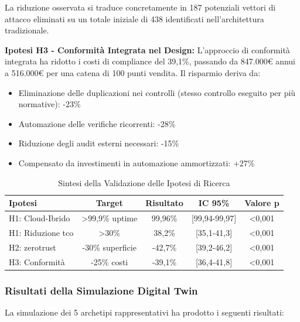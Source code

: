 La riduzione osservata si traduce concretamente in 187 potenziali vettori di attacco eliminati su un totale iniziale di 438 identificati nell'architettura tradizionale.

\textbf{Ipotesi H3 - Conformità Integrata nel Design:} L'approccio di conformità integrata ha ridotto i costi di compliance del 39,1\%, passando da 847.000€ annui a 516.000€ per una catena di 100 punti vendita. Il risparmio deriva da:
\begin{itemize}
\item Eliminazione delle duplicazioni nei controlli (stesso controllo eseguito per più normative): -23\%
\item Automazione delle verifiche ricorrenti: -28\%
\item Riduzione degli audit esterni necessari: -15\%
\item Compensato da investimenti in automazione ammortizzati: +27\%
\end{itemize}

\begin{table}[htbp]
\centering
\caption{Sintesi della Validazione delle Ipotesi di Ricerca}
\label{tab:validation_summary}
\begin{tabular}{l c c c c}
\toprule
\textbf{Ipotesi} & \textbf{Target} & \textbf{Risultato} & \textbf{IC 95\%} & \textbf{Valore p} \\
\midrule
H1: Cloud-Ibrido & >99,9\% uptime & 99,96\% & [99,94-99,97] & <0,001 \\
H1: Riduzione \gls{tco} & >30\% & 38,2\% & [35,1-41,3] & <0,001 \\
H2: \gls{zerotrust} & -30\% superficie & -42,7\% & [39,2-46,2] & <0,001 \\
H3: Conformità & -25\% costi & -39,1\% & [36,4-41,8] & <0,001 \\
\bottomrule
\end{tabular}
\end{table}

\subsubsection{Risultati della Simulazione Digital Twin}

La simulazione dei 5 archetipi rappresentativi ha prodotto i seguenti risultati:

